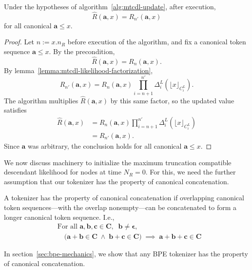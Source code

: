 \begin{theorem}
    Under the hypotheses of algorithm~\ref{alg:mtcdl-update},
    after execution,
    \[
    \widehat{R}(\mathbf{a}, x) = R_{n'}(\mathbf{a}, x)
    \]
    for all canonical $\mathbf{a} \leq x$.
\end{theorem}
\begin{proof}
    Let $n := x.n_R$ before execution of the algorithm, and fix a canonical
    token sequence $\mathbf{a} \leq x$.
    By the precondition,
    \[
    \widehat{R}(\mathbf{a}, x) = R_n(\mathbf{a}, x).
    \]
    By lemma~\ref{lemma:mtcdl-likelihood-factorization},
    \[
    R_{n'}(\mathbf{a}, x)
    =
    R_n(\mathbf{a}, x)
    \prod_{i=n+1}^{n'} \Delta^L_i(\lfloor x \rfloor_{C^L_i}).
    \]
    The algorithm multiplies $\widehat{R}(\mathbf{a}, x)$ by this same factor, so the
    updated value satisfies
    \begin{align*}
    \widehat{R}(\mathbf{a}, x)
    &=
    R_n(\mathbf{a}, x)
    \prod_{i=n+1}^{n'} \Delta^L_i(\lfloor x \rfloor_{C^L_i}) \\
    &=
    R_{n'}(\mathbf{a}, x).
    \end{align*}
    Since $\mathbf{a}$ was arbitrary, the conclusion holds for all canonical
    $\mathbf{a} \leq x$.
\end{proof}

We now discuss machinery to initialize the maximum truncation compatible descendant likelihood for nodes at time
$N_R=0$. 
For this, we need the further assumption that our
tokenizer has the property of canonical concatenation.

\begin{definition}
    A tokenizer has the property of canonical concatenation
    if overlapping canonical token sequences---with the overlap nonempty---can be concatenated to form a longer canonical token sequence.
    I.e.,
    $$
    \begin{aligned}
        &\text{For all } \mathbf{a}, \mathbf{b}, \mathbf{c} \in \mathbf{C}, \;\; \mathbf{b} \neq \mathbf{\epsilon}, \\
        &\quad \Big( \mathbf{a} + \mathbf{b} \in \mathbf{C} \;\land\; \mathbf{b} + \mathbf{c} \in \mathbf{C} \Big)
        \;\implies\; \mathbf{a} + \mathbf{b} + \mathbf{c} \in \mathbf{C}
    \end{aligned}
    $$
\end{definition}

In section~\ref{sec:bpe-mechanics},
we show that any BPE tokenizer has the property of canonical concatenation.

